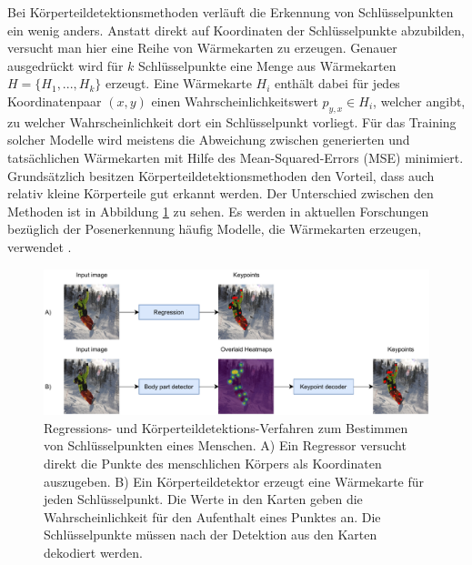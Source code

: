Bei Körperteildetektionsmethoden verläuft die Erkennung von Schlüsselpunkten ein
wenig anders. Anstatt direkt auf Koordinaten der Schlüsselpunkte abzubilden,
versucht man hier eine Reihe von Wärmekarten zu erzeugen. Genauer ausgedrückt
wird für $k$ Schlüsselpunkte eine Menge aus Wärmekarten $H = \{H_1, ..., H_k\}$
erzeugt. Eine Wärmekarte $H_i$ enthält dabei für jedes Koordinatenpaar $(x, y)$
einen Wahrscheinlichkeitswert $p_{y, x} \in H_i$, welcher angibt, zu welcher
Wahrscheinlichkeit dort ein Schlüsselpunkt vorliegt.  Für das Training solcher
Modelle wird meistens die Abweichung zwischen generierten und tatsächlichen
Wärmekarten mit Hilfe des Mean-Squared-Errors (MSE) minimiert. Grund\-sätz\-lich
besitzen Körperteildetektionsmethoden den Vorteil, dass auch relativ kleine
Körperteile gut erkannt werden. Der Unterschied zwischen den Methoden ist in
Abbildung \ref{fig:pose-detection} zu sehen. Es werden in aktuellen Forschungen
bezüglich der Posenerkennung häufig Modelle, die Wärmekarten erzeugen, verwendet
\cite{zheng2021deep}.

\begin{figure}
    \includegraphics[width=\textwidth]{images/pose_detection.pdf}
    \caption{Regressions- und Körperteildetektions-Verfahren
    zum Be\-stim\-men von Schlüs\-sel\-punk\-ten eines Menschen. A) Ein Regressor
    versucht direkt die Punkte des menschlichen Körpers als Koordinaten
    auszugeben. B) Ein Körper\-teil\-detektor erzeugt eine Wärmekarte für jeden
    Schlüsselpunkt. Die Werte in den Karten geben die Wahrscheinlichkeit für den
    Aufenthalt eines Punktes an. Die Schlüsselpunkte müssen nach der Detektion aus den Karten dekodiert werden.}
    \label{fig:pose-detection}
\end{figure}


